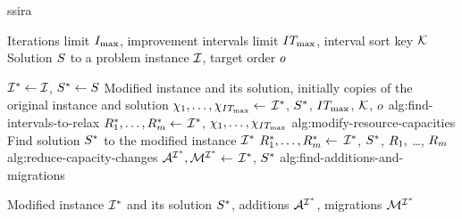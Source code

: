 \begin{algorithm}[t]
\caption{\acf{ssira}}
\label{alg:schedule-suffix-interval-relaxing-algorithm}
\begin{algorithmic}[1]

\Params  Iterations limit $\algMaxiter$, improvement intervals limit $IT_{\max}$,
\Paramsc interval sort key $\mathcal{K}$
\Input  Solution $S$ to a problem instance $\mathcal{I}$, target order $o$

\State $\mathcal{I}^* \gets \mathcal{I}$, $S^* \gets S$
       \Comment Modified instance and its solution, initially
       \Statecr copies of the original instance and solution
\Repeat \label{alg:ssira/repeat}
    \State $\chi_1, \dots, \chi_{IT_{\max}} \gets$ %
                                                                  {$\mathcal{I}^*$, $S^*$, $IT_{\max}$, $\mathcal{K}$, $o$}%
                                                                  {alg:find-intervals-to-relax}
                                                                  \label{alg:ssira/ints}
    \State $R_{1}^*, \dots, R_{m}^* \gets$ %
                                                                   {$\mathcal{I}^*$, $\chi_1, \dots, \chi_{IT_{\max}}$}%
                                                                   {alg:modify-resource-capacities}
                                                                   \label{alg:ssira/modify}
    \State Find solution $S^*$ to the modified instance $\mathcal{I}^*$ \label{alg:ssira/solution}
    \State $R_{1}^*, \dots, R_{m}^* \gets$ %
                                                                   {$\mathcal{I}^*$, $S^*$, $R_{1},$ \dots, $R_{m}$}%
                                                                   {alg:reduce-capacity-changes}
                                                                   \label{alg:ssira/reduction}
    \State $\mathcal{A}^{\mathcal{I}^*}, \mathcal{M}^{\mathcal{I}^*} \gets $
                   {$\mathcal{I}^*$, $S^*$}%
                   {alg:find-additions-and-migrations}
                   \label{alg:ssira/additions-migrations}
\ForIter{$\algMaxiter$} \label{alg:ssira/for-iters}

\Output  Modified instance $\mathcal{I}^*$ and its solution $S^*$,
\Outputc additions $\mathcal{A}^{\mathcal{I}^*}$, migrations $\mathcal{M}^{\mathcal{I}^*}$
\end{algorithmic}
\end{algorithm}


